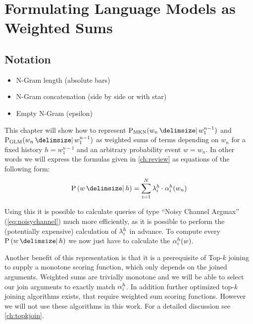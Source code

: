 \chapter{Formulating Language Models as Weighted Sums}
\label{ch:weightedsum}

\section{Notation}

\begin{itemize}
  \item N-Gram length (absolute bars)
  \item N-Gram concatenation (side by side or with star)
  \item Empty N-Gram (epsilon)
\end{itemize}



This chapter will show how to represent  $\ProbMKN{w_n}{w_1^{n-1}}$ and
$\ProbGLM{w_n}{w_1^{n-1}}$ as weighted sums of terms depending on $w_n$ for a
fixed history $h = w_1^{n-1}$ and an  arbitrary probability event $w = w_n$.
In other words we will express the formulas given in \cref{ch:review} as
equations of the following form:
\begin{equation}
  \label{eq:weightedsum}
  \Prob{w}{h} = \sum_{i = 1}^{N} \SumWeight_i^h \cdot \SumArg_i^h(w_n)
\end{equation}

Using this it is possible to calculate queries of type ``Noisy Channel Argmax''
(\cref{eq:noisychannel}) much more efficiently, as it is possible to perform the
(potentially expensive) calculation of $\lambda_i^h$ in advance.
To compute every $\Prob{w}{h}$ we now just have to calculate the
$\alpha_i^h(w)$.

Another benefit of this representation is that it is a prerequisite of Top-$k$
joining to supply a monotone scoring function, which only depends on the
joined arguments.
Weighted sums are trivially monotone  and we will be able to
select our join arguments to exactly match $\alpha_i^h$.
In addition further optimized top-$k$ joining algorithms exists, that require
weighted sum scoring functions.
However we will not use these algorithms in this work.
For a detailed discussion see \cref{ch:topkjoin}.

